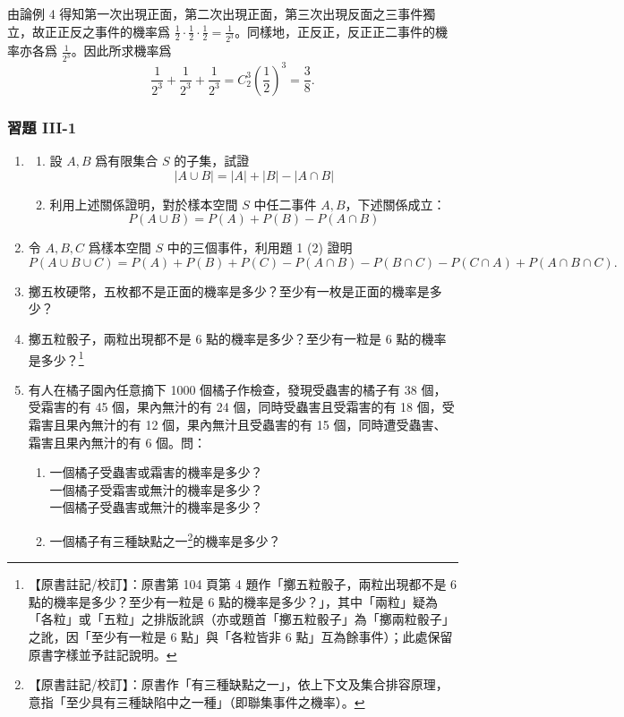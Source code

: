 由論例 4 得知第一次出現正面，第二次出現正面，第三次出現反面之三事件獨立，故正正反之事件的機率爲 $\frac{1}{2} \cdot \frac{1}{2} \cdot \frac{1}{2} = \frac{1}{2^3}$。同樣地，正反正，反正正二事件的機率亦各爲 $\frac{1}{2^3}$。因此所求機率爲
\[
\frac{1}{2^3} + \frac{1}{2^3} + \frac{1}{2^3} = C_2^3 \left(\frac{1}{2}\right)^3 = \frac{3}{8}. \tag*{\#}
\]

\subsubsection*{習題 III-1}\label{sec:b5s-ex3-1}

\begin{enumerate}[label=\textbf{\arabic*.}]
  \item 
  \begin{enumerate}[label=(\arabic*)]
    \item 設 $A, B$ 爲有限集合 $S$ 的子集，試證
    \[
    |A \cup B| = |A| + |B| - |A \cap B|
    \]
    \item 利用上述關係證明，對於樣本空間 $S$ 中任二事件 $A, B$，下述關係成立：
    \[
    P(A \cup B) = P(A) + P(B) - P(A \cap B)
    \]
  \end{enumerate}

  \item 令 $A, B, C$ 爲樣本空間 $S$ 中的三個事件，利用題 1 (2) 證明
  \[
  P(A \cup B \cup C) = P(A) + P(B) + P(C) - P(A \cap B) - P(B \cap C) - P(C \cap A) + P(A \cap B \cap C).
  \]

  \item 擲五枚硬幣，五枚都不是正面的機率是多少？至少有一枚是正面的機率是多少？

  \item 擲五粒骰子，兩粒出現都不是 6 點的機率是多少？至少有一粒是 6 點的機率是多少？\label{note:b5s-ch3-p104-q4}\footnote{【原書註記/校訂】：原書第 104 頁第 4 題作「擲五粒骰子，兩粒出現都不是 6 點的機率是多少？至少有一粒是 6 點的機率是多少？」，其中「兩粒」疑為「各粒」或「五粒」之排版訛誤（亦或題首「擲五粒骰子」為「擲兩粒骰子」之訛，因「至少有一粒是 6 點」與「各粒皆非 6 點」互為餘事件）；此處保留原書字樣並予註記說明。}

  \item 有人在橘子園內任意摘下 1000 個橘子作檢查，發現受蟲害的橘子有 38 個，受霜害的有 45 個，果內無汁的有 24 個，同時受蟲害且受霜害的有 18 個，受霜害且果內無汁的有 12 個，果內無汁且受蟲害的有 15 個，同時遭受蟲害、霜害且果內無汁的有 6 個。問：
  \begin{enumerate}[label=(\arabic*)]
    \item 一個橘子受蟲害或霜害的機率是多少？\\
    一個橘子受霜害或無汁的機率是多少？\\
    一個橘子受蟲害或無汁的機率是多少？
    \item 一個橘子有三種缺點之一\label{note:b5s-ch3-p104-q5}\footnote{【原書註記/校訂】：原書作「有三種缺點之一」，依上下文及集合排容原理，意指「至少具有三種缺陷中之一種」（即聯集事件之機率）。}的機率是多少？
  \end{enumerate}


\end{enumerate}
